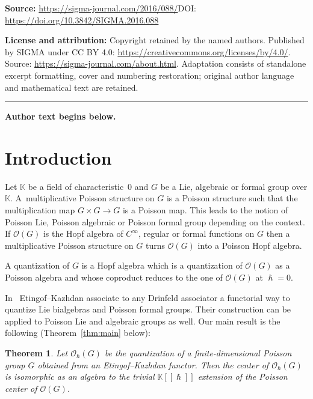 \documentclass[11pt]{article}
\numberwithin{equation}{section}
\newcommand{\h}{\hslash}
\newcommand{\cO}{\mathcal O}
\newcommand{\kk}{\mathbb K}
\newtheorem{thm}{Theorem}[section]
\theoremstyle{definition}
\begin{document}
\noindent\textbf{Source:} \url{https://sigma-journal.com/2016/088/}\quad DOI: \url{https://doi.org/10.3842/SIGMA.2016.088}\par
\noindent\textbf{License and attribution:} Copyright retained by the named authors. Published by SIGMA under CC BY 4.0: \url{https://creativecommons.org/licenses/by/4.0/}. Source: \url{https://sigma-journal.com/about.html}. Adaptation consists of standalone excerpt formatting, cover and numbering restoration; original author language and mathematical text are retained.\par
\medskip\hrule\medskip\noindent\textbf{Author text begins below.}\par
\setcounter{section}{0}
\setcounter{subsection}{0}
\setcounter{subsubsection}{0}
\setcounter{thm}{0}
\setcounter{equation}{0}
\section{Introduction}

Let $\kk$ be a f\/ield of characteristic~0 and $G$ be a Lie, algebraic or formal group over $\kk$. A~multiplicative Poisson structure on $G$ is a Poisson structure such that the multiplication map $G\times G\rightarrow G$ is a Poisson map. This leads to the notion of Poisson Lie, Poisson algebraic or Poisson formal group depending on the context. If $\cO(G)$ is the Hopf algebra of $C^{\infty}$, regular or formal functions on $G$ then a multiplicative Poisson structure on $G$ turns $\cO(G)$ into a Poisson Hopf algebra.

A quantization of $G$ is a Hopf algebra which is a quantization of $\cO(G)$ as a Poisson algebra and whose coproduct reduces to the one of $\cO(G)$ at $\h=0$.

In~\cite{Etingof1996} Etingof--Kazhdan associate to any Drinfeld associator a functorial way to quantize Lie bialgebras and Poisson formal groups. Their construction can be applied to Poisson Lie and algebraic groups as well. Our main result is the following (Theorem~\ref{thm:main} below):
\begin{thm}\label{thm:intro}
	Let $\cO_\h(G)$ be the quantization of a finite-dimensional Poisson group $G$ obtained from an Etingof--Kazhdan functor. Then the center of $\cO_\h(G)$ is isomorphic as an algebra to the trivial $\kk[[\h]]$ extension of the Poisson center of $\cO(G)$.
\end{thm}
\setcounter{section}{1}
\setcounter{subsection}{0}
\setcounter{subsubsection}{0}
\setcounter{thm}{2}
\setcounter{equation}{0}
\end{document}
